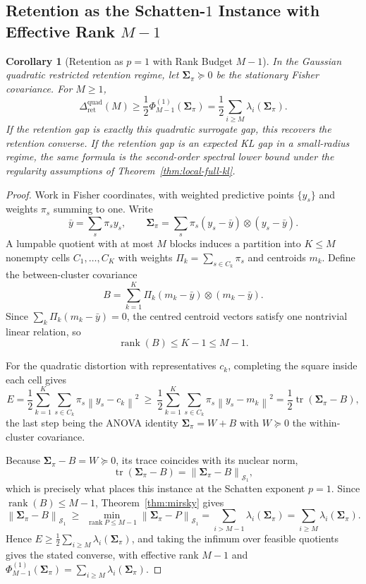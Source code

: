 \documentclass[12pt]{article}
\newtheorem{corollary}[theorem]{Corollary}
\theoremstyle{definition}
\DeclareMathOperator{\rank}{rank}
\DeclareMathOperator{\tr}{tr}
\newcommand{\norm}[1]{\left\lVert#1\right\rVert}
\newcommand{\RetQuad}{\Delta_{\mathrm{ret}}^{\mathrm{quad}}}
\newcommand{\Sp}[1]{\mathcal S_{#1}}
\begin{document}
\subsection{Retention as the Schatten-$1$ Instance with Effective Rank $M-1$}
\label{subsec:schatten-retention}

\begin{corollary}[Retention as $p=1$ with Rank Budget $M-1$]
\label{cor:ret-schatten}
In the Gaussian quadratic restricted retention regime, let
$\bm{\Sigma}_\pi\succeq0$ be the stationary Fisher covariance.  For $M\ge1$,
\[
\RetQuad(M)
\ge
\frac12
\Phi^{(1)}_{M-1}(\bm{\Sigma}_\pi)
=
\frac12
\sum_{i\ge M}
\lambda_i(\bm{\Sigma}_\pi).
\]
If the retention gap is exactly this quadratic surrogate gap, this recovers
the retention converse.  If the retention gap is an expected KL gap in a
small-radius regime, the same formula is the second-order spectral lower bound
under the regularity assumptions of Theorem~\ref{thm:local-full-kl}.
\end{corollary}

\begin{proof}
Work in Fisher coordinates, with weighted predictive points $\{y_s\}$ and
weights $\pi_s$ summing to one.  Write
\[
\bar y=\sum_s\pi_sy_s,
\qquad
\bm{\Sigma}_\pi=\sum_s\pi_s(y_s-\bar y)\otimes(y_s-\bar y).
\]
A lumpable quotient with at most $M$ blocks induces a partition into
$K\le M$ nonempty cells $C_1,\dots,C_K$ with weights
$\Pi_k=\sum_{s\in C_k}\pi_s$ and centroids $m_k$.  Define the between-cluster
covariance
\[
B=\sum_{k=1}^K\Pi_k(m_k-\bar y)\otimes(m_k-\bar y).
\]
Since $\sum_{k}\Pi_k(m_k-\bar y)=0$, the centred centroid vectors satisfy one
nontrivial linear relation, so
\[
\rank(B)\le K-1\le M-1 .
\]

For the quadratic distortion with representatives $c_k$, completing the square
inside each cell gives
\[
E
=
\frac12\sum_{k=1}^K\sum_{s\in C_k}\pi_s\norm{y_s-c_k}^2
\ \ge\
\frac12\sum_{k=1}^K\sum_{s\in C_k}\pi_s\norm{y_s-m_k}^2
=
\frac12\tr(\bm{\Sigma}_\pi-B),
\]
the last step being the ANOVA identity $\bm{\Sigma}_\pi=W+B$ with $W\succeq0$ the
within-cluster covariance.

Because $\bm{\Sigma}_\pi-B=W\succeq0$, its trace coincides with its nuclear norm,
\[
\tr(\bm{\Sigma}_\pi-B)=\norm{\bm{\Sigma}_\pi-B}_{\Sp{1}},
\]
which is precisely what places this instance at the Schatten exponent $p=1$.
Since $\rank(B)\le M-1$, Theorem~\ref{thm:mirsky} gives
\[
\norm{\bm{\Sigma}_\pi-B}_{\Sp{1}}
\ \ge\
\min_{\rank P\le M-1}\norm{\bm{\Sigma}_\pi-P}_{\Sp{1}}
=
\sum_{i>M-1}\lambda_i(\bm{\Sigma}_\pi)
=
\sum_{i\ge M}\lambda_i(\bm{\Sigma}_\pi).
\]
Hence $E\ge\frac12\sum_{i\ge M}\lambda_i(\bm{\Sigma}_\pi)$, and taking the infimum
over feasible quotients gives the stated converse, with effective rank $M-1$
and $\Phi^{(1)}_{M-1}(\bm{\Sigma}_\pi)=\sum_{i\ge M}\lambda_i(\bm{\Sigma}_\pi)$.
\end{proof}
\end{document}
